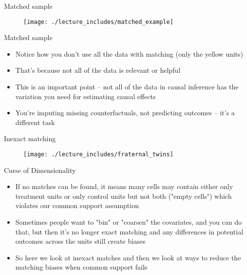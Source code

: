 \documentclass{beamer}
\begin{document}
\begin{frame}{Matched sample}

\begin{figure}[!t]\centering
\texttt{[image: ./lecture\_includes/matched\_example]}
\end{figure}



\end{frame}

\begin{frame}{Matched sample}

\begin{itemize}
\item Notice how you don't use all the data with matching (only the yellow units)
\item That's because not all of the data is relevant or helpful
\item This is an important point -- not all of the data in causal inference has the variation you need for estimating causal effects
\item You're imputing missing counterfactuals, not predicting outcomes -- it's a different task
\end{itemize}

\end{frame}




\begin{frame}{Inexact matching}

\begin{figure}[!t]\centering
\texttt{[image: ./lecture\_includes/fraternal\_twins]}
\end{figure}

\end{frame}


\begin{frame}{Curse of Dimensionality}
	
	\begin{itemize}
	\item If no matches can be found, it means many cells may contain either only treatment units or only control units but not both ("empty cells") which violates our common support assumption
	\item Sometimes people want to "bin" or "coarsen" the covariates, and you can do that, but then it's no longer exact matching and any differences in potential outcomes across the units still create biases
	\item So here we look at inexact matches and then we look at ways to reduce the matching biases when common support fails
	\end{itemize}
\end{frame}	
\end{document}
